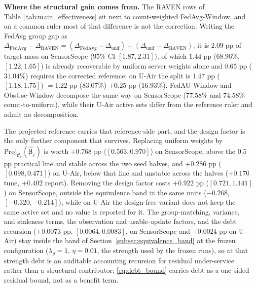 \documentclass[letterpaper,journal]{IEEEtran}
\begin{document}
\noindent\textbf{Where the structural gain comes from.}
The RAVEN rows of Table~\ref{tab:main_effectiveness} sit next to count-weighted
FedAvg-Window, and on a common ruler most of that difference is not the
correction.  Writing the FedAvg group gap as
$\Delta_{\mathrm{FedAvg}}-\Delta_{\mathrm{RAVEN}}
=(\Delta_{\mathrm{FedAvg}}-\Delta_{\mathrm{unif}})
+(\Delta_{\mathrm{unif}}-\Delta_{\mathrm{RAVEN}})$, it is $2.09$ pp of target
mass on SensorScope ($95\%$ CI $[1.87,2.31]$), of which $1.44$ pp
($68.96\%$, $[1.22,1.65]$) is already recoverable by uniform server weights
alone and $0.65$ pp ($31.04\%$) requires the corrected reference; on U-Air the
split is $1.47$ pp ($[1.18,1.75]$) $=1.22$ pp ($83.07\%$) $+0.25$ pp
($16.93\%$).  FedAU-Window and ObsUse-Window decompose the same way on
SensorScope ($77.58\%$ and $74.58\%$ count-to-uniform), while their U-Air active
sets differ from the reference ruler and admit no decomposition.

The projected reference carries that reference-side part, and the design factor
is the only further component that survives.  Replacing uniform weights by
$\mathrm{Proj}_{\mathcal{C}_r}(\widehat{\boldsymbol\beta}_r)$ is worth $+0.768$ pp
($[0.563,0.970]$) on SensorScope, above the $0.5$ pp practical line and stable
across the two seed halves, and $+0.286$ pp ($[0.098,0.471]$) on U-Air, below
that line and unstable across the halves ($+0.170$ tune, $+0.402$ report).
Removing the design factor costs $+0.922$ pp ($[0.721,1.141]$) on SensorScope,
outside the equivalence band in the same units ($-0.268$, $[-0.320,-0.214]$),
while on U-Air the design-free variant does not keep the same active set and no
value is reported for it.  The group-matching, variance, and staleness terms, the
observation and usable-update factors, and the debt
recursion ($+0.0073$ pp, $[0.0064,0.0083]$, on SensorScope and $+0.0024$ pp on
U-Air) stay inside the band of Section~\ref{subsec:equivalence_band} at the
frozen configuration ($\lambda_g=1$, $\eta=0.01$, the strength used by the frozen
runs), so at that strength debt is an auditable accounting recursion for
residual under-service rather than a structural contributor;
\eqref{eq:debt_bound} carries debt as a one-sided residual bound, not as a
benefit term.
\end{document}
